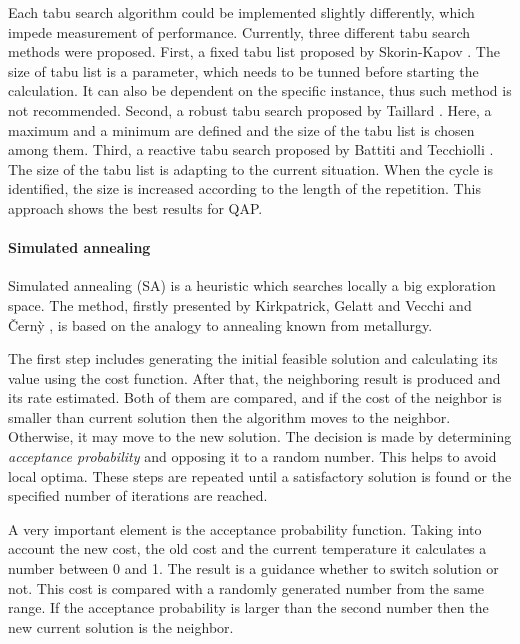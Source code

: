 Each tabu search algorithm could be implemented slightly differently, which impede measurement of performance.
Currently, three different tabu search methods were proposed.
First, a fixed tabu list proposed by Skorin-Kapov \cite{skorin1990tabu}.
The size of tabu list is a parameter, which needs to be tunned before starting the calculation.
It can also be dependent on the specific instance, thus such method is not recommended.
Second, a robust tabu search proposed by Taillard \cite{taillard1991robust}.
Here, a maximum and a minimum are defined and the size of the tabu list is chosen among them.
Third, a reactive tabu search proposed by Battiti and Tecchiolli \cite{battiti1994reactive}.
The size of the tabu list is adapting to the current situation.
When the cycle is identified, the size is increased according to the length of the repetition.
This approach shows the best results for QAP.

\paragraph{Simulated annealing}

Simulated annealing (SA) is a heuristic which searches locally a big exploration space.
The method, firstly presented by Kirkpatrick, Gelatt and Vecchi \cite{kirkpatrick1983optimization} and {\v{C}}ern{\`y} \cite{vcerny1985thermodynamical}, is based on the analogy to annealing known from metallurgy.

The first step includes generating the initial feasible solution and calculating its value using the cost function.
After that, the neighboring result is produced and its rate estimated.
Both of them are compared, and if the cost of the neighbor is smaller than current solution then the algorithm moves to the neighbor.
Otherwise, it may move to the new solution.
The decision is made by determining \textit{acceptance probability} and opposing it to a random number.
This helps to avoid local optima.
These steps are repeated until a satisfactory solution is found or the specified number of iterations are reached.

A very important element is the acceptance probability function.
Taking into account the new cost, the old cost and the current temperature it calculates a number between 0 and 1.
The result is a guidance whether to switch solution or not.
This cost is compared with a randomly generated number from the same range.
If the acceptance probability is larger than the second number then the new current solution is the neighbor.

